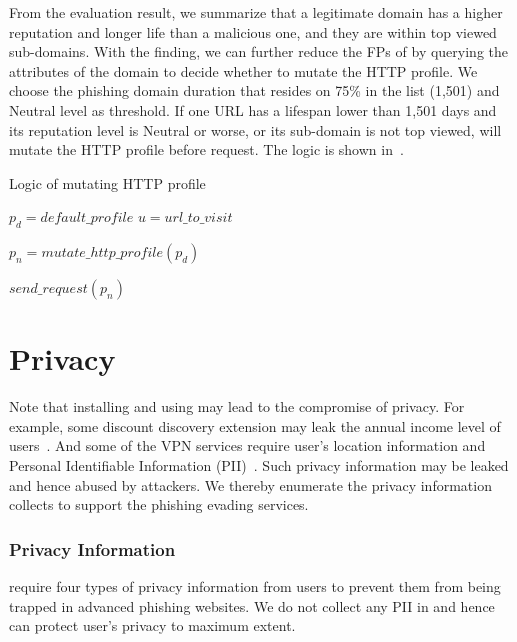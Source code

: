 From the evaluation result, we summarize that a legitimate domain has a higher reputation and longer life than a malicious one, and they are within top viewed sub-domains.
With the finding, we can further reduce the FPs of \spartacus by querying the attributes of the domain to decide whether to mutate the HTTP profile.
We choose the phishing domain duration that resides on 75\% in the list (1,501) and Neutral level as threshold.
If one URL has a lifespan lower than 1,501 days and its reputation level is Neutral or worse, or its sub-domain is not top viewed, \spartacus will mutate the HTTP profile before request.
The logic is shown in~.

\begin{algorithm}
  \caption{Logic of mutating HTTP profile}
\begin{algorithmic}[1]

\State $p_d = default\_profile$
\State $u = url\_to\_visit$

    \State $p_n = mutate\_http\_profile(p_d)$
\EndIf

\State $send\_request(p_n)$

\end{algorithmic}
\label{alg:mutatelogic}
\end{algorithm}



\section{Privacy}

Note that installing and using \spartacus may lead to the compromise of privacy.
For example, some discount discovery extension may leak the annual income level of users~\cite{honey}.
And some of the VPN services require user's location information and Personal Identifiable Information (PII)~\cite{ZenMate}.
Such privacy information may be leaked and hence abused by attackers.  
We thereby enumerate the privacy information \spartacus collects to support the phishing evading services.

\subsubsection{Privacy Information}

\spartacus require four types of privacy information from users to prevent them from being trapped in advanced phishing websites.
We do not collect any PII in \spartacus and hence can protect user's privacy to maximum extent.

